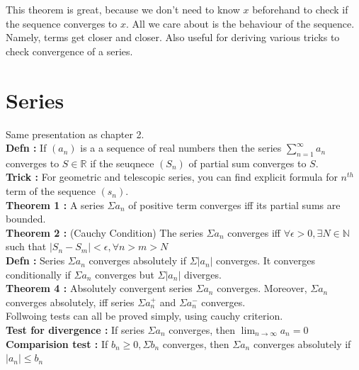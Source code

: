 \documentclass{report}
\begin{document}
This theorem is great, because we don't need to know $x$ beforehand to check if the sequence converges to $x$. All we care about is the behaviour of the sequence. Namely, terms get closer and closer. Also useful for deriving various tricks to check convergence of a series.




\chapter{Series}
Same presentation as chapter 2.\\

\noindent \textbf{Defn : }If $(a_n)$ is a a sequence of real numbers then the series $\sum_{n=1}^{\infty}a_n$  converges to $S \in \mathbb{R}$ if the seuqnece $(S_n)$ of partial sum converges to $S$.\\

\noindent \textbf{Trick : } For geometric and telescopic series, you can find explicit formula for $n^{th}$ term of the sequence $(s_n)$.\\

\noindent \textbf{Theorem 1 :} A series $\Sigma a_n$ of positive term converges iff its partial sums are bounded.\\

\noindent \textbf{Theorem 2 :} (Cauchy Condition) The series $\Sigma a_n$ converges iff $\forall \epsilon > 0, \exists N \in \mathbb{N}$ such that $|S_n - S_m| < \epsilon, \forall n > m > N$\\

\noindent \textbf{Defn :} Series $\Sigma a_n$ converges absolutely if $\Sigma |a_n|$ converges. It converges conditionally if $\Sigma a_n$ converges but $\Sigma |a_n|$ diverges.\\

\noindent \textbf{Theorem 4 :} Absolutely convergent series $\Sigma a_n$ converges. Moreover, $\Sigma a_n$ converges absolutely, iff series $\Sigma a_n^{+}$ and $\Sigma a_n^{-}$ converges.\\

Follwoing tests can all be proved simply, using cauchy criterion.\\

\noindent \textbf{Test for divergence :}  If series $\Sigma a_n$ converges, then $\lim_{n\to\infty} a_n = 0$ \\

\noindent \textbf{Comparision test :} If $b_n\ge0, \Sigma b_n$ converges, then $\Sigma a_n$ converges absolutely if $|a_n| \le b_n$\\
\end{document}
